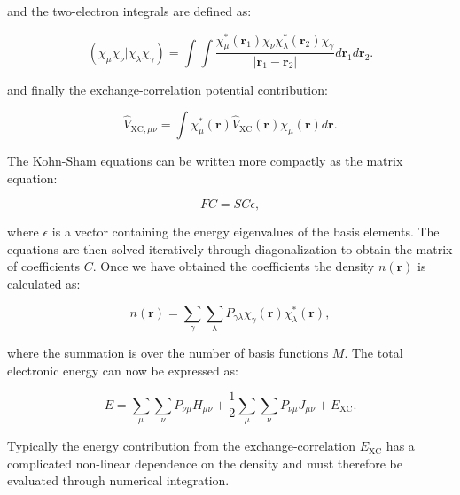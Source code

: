 and the two-electron integrals are defined as:

\begin{equation}
\left(\chi_{\mu}\chi_{\nu} | \chi_{\lambda}\chi_{\gamma}\right)
    = \int \int \frac{\chi_{\mu}^*(\bm{r}_1) \chi_{\nu}
    \chi_{\lambda}^*(\bm{r}_2) \chi_{\gamma}}
    {\left| \bm{r}_1 - \bm{r}_2 \right|}
    d\bm{r}_1 d\bm{r}_2 .
\end{equation}

and finally the exchange-correlation potential contribution:

\begin{equation}
\hat{V}_{\text{XC},\mu\nu} = \int \chi_{\mu}^*(\bm{r})
    \hat{V}_{\text{XC}}(\bm{r}) \chi_{\mu}(\bm{r}) d\bm{r} .
\end{equation}

The Kohn-Sham equations can be written more compactly as the matrix equation:

\begin{equation}
 FC = SC\epsilon ,
\end{equation}

where $\epsilon$ is a vector containing the energy eigenvalues
of the basis elements. The equations are then solved
iteratively through diagonalization to obtain
the matrix of coefficients $C$. Once we have obtained the
coefficients the density $n(\bm{r})$ is calculated as:

\begin{equation}
 n(\bm{r}) = \sum_{\gamma} \sum_{\lambda} P_{\gamma\lambda}
    \chi_{\gamma}(\bm{r}) \chi_{\lambda}^*(\bm{r}) ,
\end{equation}

where the summation is over the number of basis functions $M$.
The total electronic energy can now be expressed
as:

\begin{equation}
E = \sum_{\mu} \sum_{\nu} P_{\nu\mu} H_{\mu\nu}
    +\frac{1}{2} \sum_{\mu} \sum_{\nu} P_{\nu\mu}
    J_{\mu\nu}
    + E_{\text{XC}} .
\end{equation}

Typically the energy contribution from the exchange-correlation
$E_{\text{XC}}$ has a complicated non-linear dependence on the
density and must therefore be evaluated through
numerical integration.
